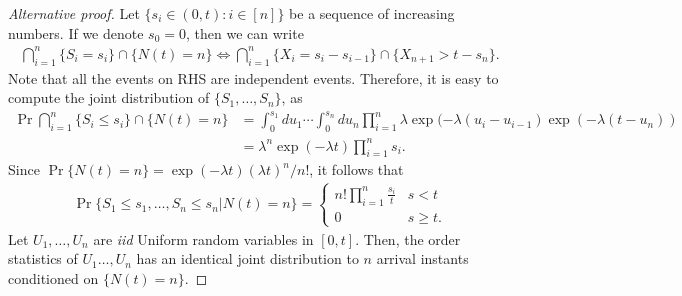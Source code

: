 \documentclass[a4paper,10pt,english]{article}
\begin{document}
\begin{proof}[Alternative proof] Let $\{ s_i \in (0, t) : i \in [n]\}$ be a sequence of increasing numbers. If we denote $s_{0} = 0$, then we can write 
\begin{align*}
\bigcap_{i=1}^n\{S_i = s_i\}\cap\{N(t) = n\} \iff \bigcap_{i=1}^n\{X_i = s_i - s_{i-1}\}\cap\{X_{n+1} > t - s_n\}.
\end{align*}
Note that all the events on RHS are independent events. Therefore, it is easy to compute the joint distribution of $\{S_1,\ldots, S_n\}$, as 
\begin{align*}
\Pr\bigcap_{i=1}^n\{S_i \leq s_i\}\cap\{N(t) = n\} &= \int_{0}^{s_1}du_1\cdots\int_{0}^{s_n}du_n \prod_{i=1}^n\lambda \exp(-\lambda (u_i-u_{i-1})\exp(-\lambda (t-u_n))\\
&= \lambda^n\exp(-\lambda t)\prod_{i=1}^ns_i.
\end{align*}
Since $\Pr\{N(t) = n\} = \exp(-\lambda t)(\lambda t)^n/n! $, it follows that 
\begin{align*}
\Pr\{S_1 \leq s_1,\ldots, S_n\leq s_n | N(t) = n\} = 
\begin{cases}
n!\prod_{i=1}^n\frac{s_i}{t} & s < t\\ 
0 & s \geq t.
\end{cases}
\end{align*}
Let $U_{1},\ldots,U_{n}$ are \emph{iid} Uniform random variables in $[0,t]$. Then, the order statistics  of $U_1 \ldots, U_n$ has an identical joint distribution to $n$ arrival instants conditioned on $\{N(t)=n\}$.\end{proof}
\end{document}
